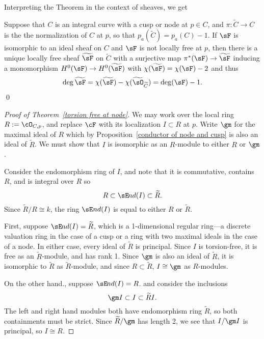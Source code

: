 Interpreting the Theorem in the context of sheaves, we get

\begin{corollary}
Suppose that $C$ is an integral curve with a cusp or node at $p\in C$, and $\pi:\widetilde C \to C$ is the
the  normalization of $C$ at $p$, so that $p_a(\widetilde C) = p_a(C) -1$. If $\sF$ is isomorphic to an ideal sheaf on $C$
and $\sF$ is not locally free at $p$, then there is a unique locally free sheaf $\widetilde \sF$ on $\widetilde C$
with a surjective map $\pi^*(\sF) \to \widetilde\sF$ inducing a monomorphism $H^0(\sF) \to H^0(\widetilde\sF)$
with $\chi(\widetilde \sF) = \chi(\sF) -2$ and thus 
$$
\deg \widetilde \sF = \chi(\widetilde \sF) - \chi(\widetilde \sO_{\widetilde C}) = 
\deg(\sF)-1.
$$
\qed
\end{corollary}

\begin{proof}[Proof of Theorem~\ref{torsion free at node}] We may work over the local ring $R := \cO_{C,p}$, and replace $\cF$ with 
its localization $I\subset R$ at $p$. Write
$\gm$ for the maximal ideal of $R$ which by Proposition~\ref{conductor of node and cusp} is also an ideal of $\widetilde R$.
We must show that $I$ is isomorphic as an $R$-module to either $R$ or $\gm$.

\def\sEnd{{\sE \kern-1pt nd}}

Consider the endomorphism ring of $I$, and note that it is commutative, contains $R$,  and is integral over $R$ so 
$$
R \subset \sEnd(I) \subset \widetilde R.
$$
Since
$\widetilde R/R \cong k$, the ring $\sE nd(I)$ is equal to either 
$R$ or $\widetilde R$. 

First, suppose
$\sEnd(I)=\widetilde R$, which is a 1-dimensional regular ring---a discrete valuation ring in the case of a cusp
or a ring with two maximal ideals in the case of a node. In either case, every ideal of $\widetilde R$ is principal.
 Since $I$ is torsion-free, it is free as an 
$\widetilde R$-module, and has rank 1. Since $\gm$ is also an ideal of $\widetilde R$, it is isomorphic to $\widetilde R$
as $\widetilde R$-module, and since $R\subset \widetilde R$,
$I \cong \gm$ as $R$-modules.

On the other hand., suppose
$\sEnd(I)=R$.
 and consider the inclusions
$$
\gm I \subset I \subset \widetilde R I.
$$
The left and right hand modules both have endomorphism ring $\widetilde R$,
so both containments must be strict. Since $\widetilde R/\gm$ has length 2,
we see that $I/\gm I$ is principal, so $I\cong R$.
\end{proof}

